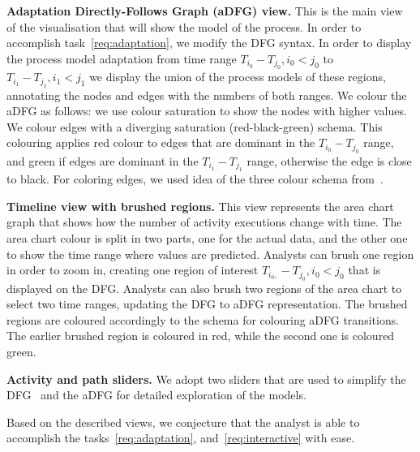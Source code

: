 \textbf{Adaptation Directly-Follows Graph (aDFG) view.} This is the main view of the visualisation that will show the model of the process. In order to accomplish task~\ref{req:adaptation}, we modify the DFG syntax. In order to display the process model adaptation from time range $T_{i_0}-T_{j_0}, i_0<j_0$ to $T_{i_1}-T_{j_1}, i_1<j_1$ we display the union of the process models of these regions, annotating the nodes and edges with the numbers of both ranges. We colour the aDFG as follows: we use colour saturation to show the nodes with higher values. We colour edges with a diverging saturation (red-black-green) schema. This colouring applies red colour to edges that are dominant in the $T_{i_0}-T_{j_0}$ range, and green if edges are dominant in the $T_{i_1}-T_{j_1}$ range, otherwise the edge is close to black. For coloring edges, we used idea of the three colour schema from~\cite{DBLP:conf/grapp/KriglsteinR12}.

\textbf{Timeline view with brushed regions.} This view represents the area chart graph that shows how the number of activity executions change with time. The area chart colour is split in two parts, one for the actual data, and the other one to show the time range where values are predicted. Analysts can brush one region in order to zoom in, creating one region of interest $T_{i_0,}-T_{j_0}, i_0<j_0$ that is displayed on the DFG. Analysts can also brush two regions of the area chart to select two time ranges, updating the DFG to aDFG representation. The brushed regions are coloured accordingly to the schema for colouring aDFG transitions. The earlier brushed region is coloured in red, while the second one is coloured green. 

\textbf{Activity and path sliders.} We adopt two sliders that are used to simplify the DFG~\cite{leemans2019directly} and the aDFG for detailed exploration of the models.

Based on the described views, we conjecture that the analyst is able to accomplish the tasks~\ref{req:adaptation}, and~\ref{req:interactive} with ease.







